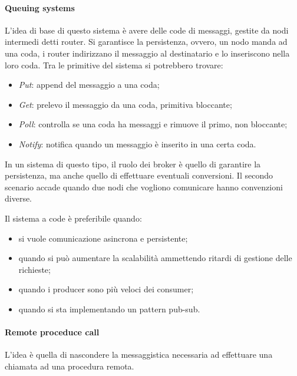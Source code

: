 \paragraph{Queuing systems}
L'idea di base di questo sistema è avere delle code di messaggi, gestite 
da nodi intermedi detti router. 
Si garantisce la persistenza, ovvero, un nodo manda ad una coda, i router 
indirizzano il messaggio al destinatario e lo inseriscono nella loro coda.
Tra le primitive del sistema si potrebbero trovare:
\begin{itemize}
    \item \emph{Put}: append del messaggio a una coda;
    \item \emph{Get}: prelevo il messaggio da una coda, primitiva bloccante;
    \item \emph{Poll}: controlla se una coda ha messaggi e rimuove il primo, non bloccante;
    \item \emph{Notify}: notifica quando un messaggio è inserito in una certa coda.
\end{itemize}
In un sistema di questo tipo, il ruolo dei broker è quello di garantire la persistenza, 
ma anche quello di effettuare eventuali conversioni. Il secondo scenario accade quando 
due nodi che vogliono comunicare hanno convenzioni diverse. 

Il sistema a code è preferibile quando:
\begin{itemize}
    \item si vuole comunicazione asincrona e persistente;
    \item quando si può aumentare la scalabilità ammettendo ritardi di gestione delle richieste;
    \item quando i producer sono più veloci dei consumer;
    \item quando si sta implementando un pattern pub-sub.
\end{itemize}

\paragraph{Remote proceduce call}
L'idea è quella di nascondere la messaggistica necessaria ad effettuare una 
chiamata ad una procedura remota.

